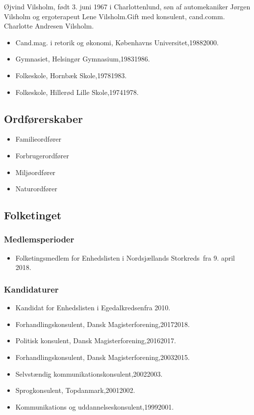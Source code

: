 \documentclass[11pt, a4paper]{awesome-cv}
\begin{document}
\makecvheader[R]
\makelettertitle
\begin{cvletter}
Øjvind Vilsholm, født 3. juni 1967 i Charlottenlund, søn af automekaniker Jørgen Vilsholm og ergoterapeut Lene Vilsholm.Gift med konsulent, cand.comm. Charlotte Andresen Vilsholm.

\begin{itemize}
\item Cand.mag. i retorik og økonomi, Københavns Universitet,19882000.
\item Gymnasiet, Helsingør Gymnasium,19831986.
\item Folkeskole, Hornbæk Skole,19781983.
\item Folkeskole, Hillerød Lille Skole,19741978.
\end{itemize}
\subsection*{Ordførerskaber}
\begin{itemize}
\item Familieordfører
\item Forbrugerordfører
\item Miljøordfører
\item Naturordfører
\end{itemize}
\subsection*{Folketinget}
\subsubsection*{Medlemsperioder}
\begin{itemize}
\item Folketingsmedlem for Enhedslisten i Nordsjællands Storkreds fra 9. april 2018.
\end{itemize}
\subsubsection*{Kandidaturer}
\begin{itemize}
\item Kandidat for Enhedslisten i Egedalkredsenfra 2010.
\end{itemize}
\begin{itemize}
\item Forhandlingskonsulent, Dansk Magisterforening,20172018.
\item Politisk konsulent, Dansk Magisterforening,20162017.
\item Forhandlingskonsulent, Dansk Magisterforening,20032015.
\item Selvstændig kommunikationskonsulent,20022003.
\item Sprogkonsulent, Topdanmark,20012002.
\item Kommunikations og uddannelseskonsulent,19992001.
\end{itemize}
\end{cvletter}
\end{document}
